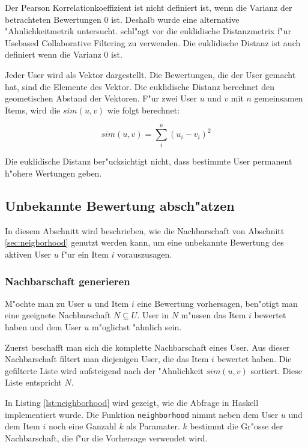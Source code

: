 \documentclass[a4paper, 12pt]{article}
\begin{document}
Der Pearson Korrelationkoeffizient ist nicht definiert ist, wenn die Varianz der betrachteten Bewertungen 0 ist. Deshalb wurde eine alternative "Ahnlichkeitmetrik untersucht. \cite{segaran} schl"agt vor die euklidische Distanzmetrix f"ur Usebased Collaborative Filtering zu verwenden. Die euklidische Distanz ist auch definiert wenn die Varianz 0 ist.

Jeder User wird als Vektor dargestellt. Die Bewertungen, die der User gemacht hat, sind die Elemente des Vektor. Die euklidische Distanz berechnet den geometischen Abstand der Vektoren. F"ur zwei User $u$ und $v$ mit $n$ gemeinsamen Items, wird die $sim(u,v)$ wie folgt berechnet:

\begin{equation}
  \label{eq:euclid}
 sim(u,v) = \sum_i^n (u_i - v_i )^2
\end{equation}

Die euklidische Distanz ber"ucksichtigt nicht, dass bestimmte User permanent h"ohere Wertungen geben.

\subsection{Unbekannte Bewertung absch"atzen}
\label{sec:compp}

In diesem Abschnitt wird beschrieben, wie die Nachbarschaft von Abschnitt \ref{sec:neigborhood} genutzt werden kann, um eine unbekannte Bewertung des aktiven User $u$ f"ur ein Item $i$ vorauszusagen.

\subsubsection{Nachbarschaft generieren}
\label{sec:generate}

M"ochte man zu User $u$ und Item $i$ eine Bewertung vorhersagen, ben"otigt man eine geeignete Nachbarschaft $N \subseteq U$. User in $N$ m"ussen das Item $i$ bewertet haben und dem User $u$ m"oglichst "ahnlich sein.

Zuerst beschafft man sich die komplette Nachbarschaft eines User. Aus dieser Nachbarschaft filtert man diejenigen User, die das Item $i$ bewertet haben. Die gefilterte Liste wird aufsteigend nach der "Ahnlichkeit $sim(u,v)$ sortiert. Diese Liste entspricht $N$. 

In Listing \ref{lst:neighborhood} wird gezeigt, wie die Abfrage in Haskell implementiert wurde. Die Funktion \verb|neighborhood| nimmt neben dem User $u$ und dem Item $i$ noch eine Ganzahl $k$ als Paramater. $k$ bestimmt die Gr"osse der Nachbarschaft, die f"ur die Vorhersage verwendet wird.
\end{document}
